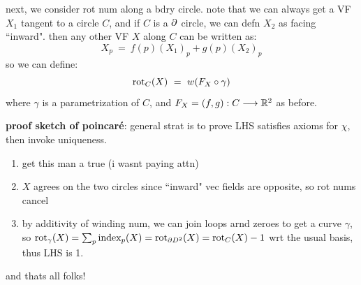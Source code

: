 next, we consider rot num along a bdry circle.
note that we can always get a VF $X_{1}$ tangent to a circle $C$,
and if $C$ is a $\partial$ circle, we can defn $X_{2}$ as facing ``inward".
then any other VF $X$ along $C$ can be written as:
\begin{equation*}
	X_{p} \ = \ f(p)(X_{1})_{p}+g(p)(X_{2})_{p}
\end{equation*}
so we can define:
\begin{equation*}
	\trm{rot}_{C}(X) \ = \ w(F_{X}\circ\gamma)
\end{equation*}
where $\gamma$ is a parametrization of $C$, and $F_{X}=(f,g):C\longrightarrow\mathbb{R}^{2}$ as before.

\textbf{proof sketch of poincar\'e}:
general strat is to prove LHS satisfies axioms for $\chi$, then invoke uniqueness.
\begin{enumerate}[E1)]
	\item get this man a true (i wasnt paying attn)
	\item $X$ agrees on the two circles since ``inward" vec fields are opposite,
		so rot nums cancel
	\item by additivity of winding num, we can join loops arnd zeroes to get a curve
		$\gamma$, so $\textrm{rot}_{\gamma}(X)=\sum_{p}\textrm{index}_{p}(X)=\textrm{rot}_{\partial D^{2}}(X)=\textrm{rot}_{C}(X)-1$
		wrt the usual basis, thus LHS is 1.
\end{enumerate}
and thats all folks!
